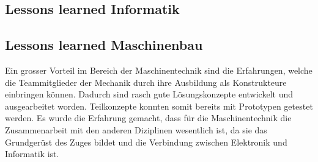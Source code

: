 \documentclass[../../main.tex]{subfiles}
\begin{document}
\subsection{Lessons learned Informatik}

\subsection{Lessons learned Maschinenbau}
Ein grosser Vorteil im Bereich der Maschinentechnik sind die Erfahrungen, welche die Teammitglieder der Mechanik durch ihre Ausbildung als Konstrukteure einbringen können. Dadurch sind rasch gute Lösungskonzepte entwickelt und ausgearbeitet worden. Teilkonzepte konnten somit bereits mit Prototypen getestet werden. Es wurde die Erfahrung gemacht, dass für die Maschinentechnik die Zusammenarbeit mit den anderen Diziplinen wesentlich ist, da sie das Grundgerüst des Zuges bildet und die Verbindung zwischen Elektronik und Informatik ist.
\end{document}
